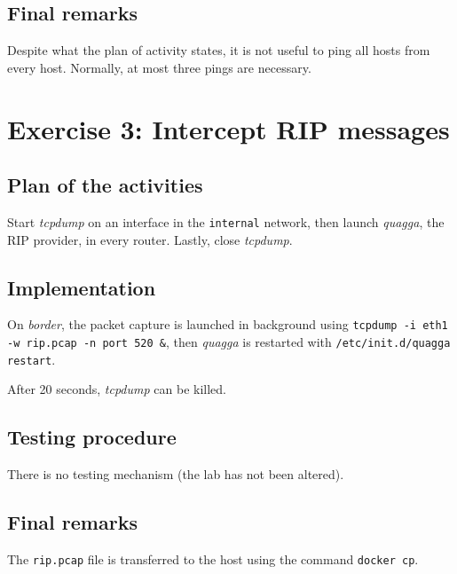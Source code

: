 \documentclass{homework}
\newcommand{\mt}{\texttt}
\begin{document}
    \subsection{Final remarks}
    Despite what the plan of activity states, it is not useful to ping all hosts from every host. Normally, at most three pings are necessary.
    
    
    \section{Exercise 3: Intercept RIP messages}
    
    \subsection{Plan of the activities}
    Start \textit{tcpdump} on an interface in the \mt{internal} network, then launch \textit{quagga}, the RIP provider, in every router. Lastly, close \textit{tcpdump}.
    
    \subsection{Implementation}
    On \textit{border}, the packet capture is launched in background using \mt{tcpdump -i eth1 -w rip.pcap -n port 520 \&}, then \textit{quagga} is restarted  with \mt{/etc/init.d/quagga restart}.
    
    After 20 seconds, \textit{tcpdump} can be killed.
    
    \subsection{Testing procedure}
    There is no testing mechanism (the lab has not been altered).
    
    \subsection{Final remarks}
    The \mt{rip.pcap} file is transferred to the host using the command \mt{docker cp}.
    
\end{document}

